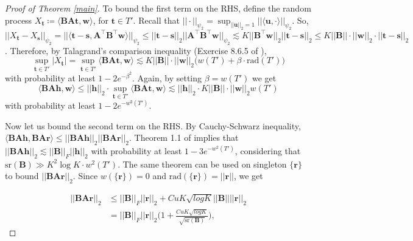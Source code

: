 \documentclass{article}
\begin{document}
\begin{proof}[Proof of Theorem \ref{main}]
To bound the first term on the RHS, define the random process $X_{\mathbf{t}} \coloneqq \langle \mathbf{B} \mathbf{A} \mathbf{t}, \mathbf{w} \rangle$, for $\mathbf{t} \in T'$. Recall that $||\cdot||_{\psi_2} = \sup_{||\mathbf{u}||_2 = 1} ||\langle \mathbf{u}, \cdot \rangle||_{\psi_2}$. So,  $||X_{\mathbf{t}}-X_{\mathbf{s}}||_{\psi_2} = ||\langle \mathbf{t} - \mathbf{s}, \mathbf{A}^\top \mathbf{B}^\top \mathbf{w} \rangle||_{\psi_2} \leq ||\mathbf{t} - \mathbf{s}||_2 ||\mathbf{A}^\top \mathbf{B}^\top \mathbf{w}||_{\psi_2} \lesssim K ||\mathbf{B}^\top \mathbf{w}||_2 ||\mathbf{t} - \mathbf{s}||_2 \leq K ||\mathbf{B}|| \cdot ||\mathbf{w}||_2 \cdot ||\mathbf{t} - \mathbf{s}||_2$. Therefore, by Talagrand's comparison inequality (Exercise 8.6.5 of \cite{vershynin}),
\begin{equation}
    \sup_{\mathbf{t} \in T'} |X_{\mathbf{t}}| = \sup_{\mathbf{t} \in T'} \langle \mathbf{B} \mathbf{A} \mathbf{t}, \mathbf{w} \rangle \lesssim K ||\mathbf{B}|| \cdot ||\mathbf{w}||_2 \big( w(T') + \beta \cdot \mathrm{rad}(T') \big)
\end{equation}
with probability at least $1-2e^{-\beta^2}$. Again, by setting $\beta = w(T')$ we get
\begin{equation} \label{ub}
    \langle \mathbf{B} \mathbf{A}\mathbf{h}, \mathbf{w} \rangle \leq ||\mathbf{h}||_2 \cdot \sup_{\mathbf{t} \in T'} \langle \mathbf{B} \mathbf{A} \mathbf{t}, \mathbf{w} \rangle \lesssim ||\mathbf{h}||_2 \cdot K||\mathbf{B}|| \cdot ||\mathbf{w}||_2 w(T')
\end{equation}
with probability at least $1-2e^{-w^2(T')}$.

Now let us bound the second term on the RHS. By Cauchy-Schwarz inequality, $\langle \mathbf{B} \mathbf{A} \mathbf{h}, \mathbf{B} \mathbf{A} \mathbf{r} \rangle \leq ||\mathbf{B} \mathbf{A} \mathbf{h}||_2 ||\mathbf{B} \mathbf{A} \mathbf{r}||_2$. Theorem 1.1 of \cite{jeong2020subgaussian} implies that $||\mathbf{B} \mathbf{A}\mathbf{h}||_2 \lesssim ||\mathbf{B}||_F ||\mathbf{h}||_2$ with probability at least $1-3e^{-w^2(T')}$, considering that $\mathrm{sr}(\mathbf{B}) \gg K^2 \log K \cdot w^2(T')$. The same theorem can be used on singleton $\{\mathbf{r}\}$ to bound $||\mathbf{B}\mathbf{A}\mathbf{r}||_2$. Since $w(\{\mathbf{r}\}) = 0$ and $\mathrm{rad}(\{\mathbf{r}\}) = ||\mathbf{r}||$, we get

    \begin{align}
        ||\mathbf{B}\mathbf{A}\mathbf{r}||_2 & \leq ||\mathbf{B}||_F ||\mathbf{r}||_2 + CuK\sqrt{log K} ||\mathbf{B}|| ||\mathbf{r}||_2 \\
        & = ||\mathbf{B}||_F ||\mathbf{r}||_2 \Big(1+ \frac{CuK\sqrt{log K}}{\sqrt{\mathrm{sr}(\mathbf{B})}} \Big),
    \end{align}


\end{proof}
\end{document}
